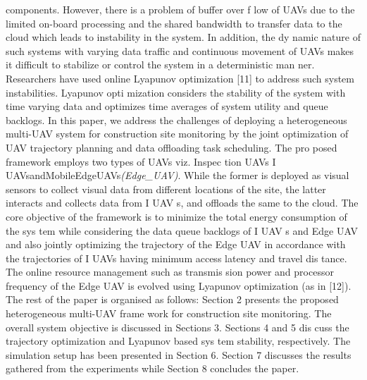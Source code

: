\documentclass[a0,portrait ] {article}
\begin{document}
\begin{multicols}{2}
 components. However, there is a problem of buffer over
f
 low of UAVs due to the limited on-board processing and
 the shared bandwidth to transfer data to the cloud which
 leads to instability in the system. In addition, the dy
namic nature of such systems with varying data traffic
 and continuous movement of UAVs makes it difficult to
 stabilize or control the system in a deterministic man
ner. Researchers have used online Lyapunov optimization
 [11] to address such system instabilities. Lyapunov opti
mization considers the stability of the system with time
 varying data and optimizes time averages of system utility
 and queue backlogs.
 In this paper, we address the challenges of deploying
 a heterogeneous multi-UAV system for construction site
 monitoring by the joint optimization of UAV trajectory
 planning and data offloading task scheduling. The pro
posed framework employs two types of UAVs viz. Inspec
tion UAVs I UAVsandMobileEdgeUAVs\emph{(Edge\_UAV)}.
 While the former is deployed as visual sensors to collect
 visual data from different locations of the site, the latter
 interacts and collects data from I UAV s, and offloads the
 same to the cloud. The core objective of the framework
 is to minimize the total energy consumption of the sys
tem while considering the data queue backlogs of I UAV s
 and Edge UAV and also jointly optimizing the trajectory
 of the Edge UAV in accordance with the trajectories of
 I UAVs having minimum access latency and travel dis
tance. The online resource management such as transmis
sion power and processor frequency of the Edge UAV is
 evolved using Lyapunov optimization (as in [12]).
 The rest of the paper is organised as follows: Section
 2 presents the proposed heterogeneous multi-UAV frame
work for construction site monitoring. The overall system
 objective is discussed in Sections 3. Sections 4 and 5 dis
cuss the trajectory optimization and Lyapunov based sys
tem stability, respectively. The simulation setup has been
 presented in Section 6. Section 7 discusses the results
 gathered from the experiments while Section 8 concludes
 the paper.


\end{multicols}
\end{document}
